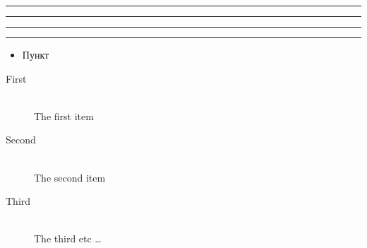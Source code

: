 \documentclass{article}
\begin{document}
     


\newlength{\barlength}
\setlength{\barlength}{4 cm minus 1 cm}
 \noindent
  \textcolor{barcolor1}{\rule{\barlength}{1cm}}
 \rule{\barlength}{1pt}
 \vspace{\barlength}
  \textcolor{barcolor2}{\rule{\barlength}{1cm}}
  \textcolor{gray50}{\rule{\barlength}{1 cm}}
    
		
        
        
   \begin{itemize}
       \item Пункт 
     \end{itemize}   
        
    \begin{description}
        \item[First] \hfill \\
        The first item
        \item[Second] \hfill \\
        The second item
        \item[Third] \hrulefill \\
        The third etc \ldots
    \end{description}    
        
        
\end{document}
